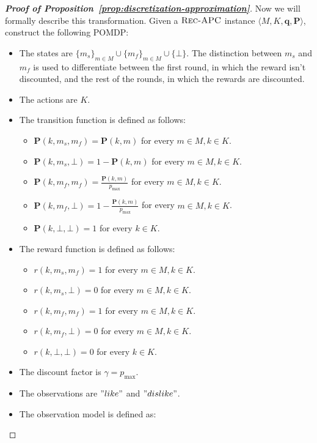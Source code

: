 \begin{proof}[\normalfont\bfseries Proof of Proposition~\ref{prop:discretization-approximation}]
  Now we will formally describe this transformation. Given a $\textsc{Rec-APC}$ instance $\langle M, K, \bm{q}, \bm{P} \rangle$, construct the following POMDP:
  \begin{itemize}
    \item The states are $\{ m_{s} \}_{m \in M} \cup \{ m_{f} \}_{m \in M} \cup \{ \bot \}$. The distinction between $m_{s}$ and $m_{f}$ is used to differentiate between the first round, in which the reward isn't discounted, and the rest of the rounds, in which the rewards are discounted.
    \item The actions are $K$.
    \item The transition function is defined as follows:
          \begin{itemize}
            \item $\bm{P}(k, m_{s}, m_{f}) = \bm{P}(k, m)$ for every $m \in M, k \in K$.
            \item $\bm{P}(k, m_{s}, \bot) = 1 - \bm{P}(k, m)$ for every $m \in M, k \in K$.
            \item $\bm{P}(k, m_{f}, m_{f}) = \frac{\bm{P}(k, m)}{p_{\max}}$ for every $m \in M, k \in K$.
            \item $\bm{P}(k, m_{f}, \bot) = 1 - \frac{\bm{P}(k, m)}{p_{\max}}$ for every $m \in M, k \in K$.
            \item $\bm{P}(k, \bot, \bot) = 1$ for every $k \in K$.
          \end{itemize}
    \item The reward function is defined as follows:
          \begin{itemize}
            \item $r(k, m_{s}, m_{f}) = 1$ for every $m \in M, k \in K$.
            \item $r(k, m_{s}, \bot) = 0$ for every $m \in M, k \in K$.
            \item $r(k, m_{f}, m_{f}) = 1$ for every $m \in M, k \in K$.
            \item $r(k, m_{f}, \bot) = 0$ for every $m \in M, k \in K$.
            \item $r(k, \bot, \bot) = 0$ for every $k \in K$.
          \end{itemize}
    \item The discount factor is $\gamma = p_{\max}$.
    \item The observations are $"like"$ and $"dislike"$.
    \item The observation model is defined as:
          \begin{itemize}

\end{itemize}
\end{itemize}
\end{proof}
